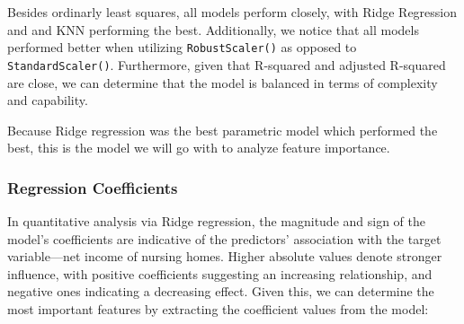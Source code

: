 \documentclass{article}
\theoremstyle{mytheoremstyle}
\theoremstyle{mytheoremstyle}
\theoremstyle{myproblemstyle}
\begin{document}
\FloatBarrier %

Besides ordinarly least squares, all models perform closely, with Ridge Regression and and KNN performing the best. Additionally, we notice that all models performed better when utilizing \texttt{RobustScaler()} as opposed to \texttt{StandardScaler()}. Furthermore, given that R-squared and adjusted R-squared are close, we can determine that the model is balanced in terms of complexity and capability. 

Because Ridge regression was the best parametric model which performed the best, this is the model we will go with to analyze feature importance. 
\pagebreak

\subsubsection{Regression Coefficients}

In quantitative analysis via Ridge regression, the magnitude and sign of the model's coefficients are indicative of the predictors' association with the target variable—net income of nursing homes. Higher absolute values denote stronger influence, with positive coefficients suggesting an increasing relationship, and negative ones indicating a decreasing effect. Given this, we can determine the most important features by extracting the coefficient values from the model:
\end{document}
